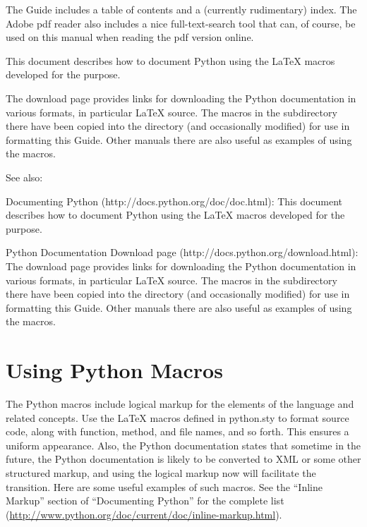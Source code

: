 The Guide includes a table of contents and a (currently rudimentary) index.
The Adobe  pdf reader also includes a nice full-text-search tool that can,
of course, be used on this manual when reading the pdf version online.

\begin{seealso}
 {This
  document describes how to document Python using the \LaTeX{} macros
  developed for the purpose.}

 {The download page provides links for downloading the
  Python documentation in various formats, in particular \LaTeX{} source.
  The macros in the  subdirectory there have been copied
  into the  directory (and occasionally modified) for use
  in formatting this Guide.  Other manuals there are also useful as
  examples of using the macros.}
\end{seealso}
\begin{htmlonly}
See also:

Documenting Python \pythonindex (http://docs.python.org/doc/doc.html): This document
describes how to document Python \pythonindex using the \LaTeX{} \latexindex macros
developed for the purpose.

Python \pythonindex Documentation Download page (http://docs.python.org/download.html):
The download page provides links for downloading the Python \pythonindex documentation
in various formats, in particular \LaTeX{} \latexindex source.  The macros in the
 subdirectory there have been copied into the
 directory (and occasionally modified) for use in
formatting this Guide.  Other manuals there are also useful as examples
of using the macros.
\end{htmlonly}

\section{Using Python Macros}
\pythonindex

The Python \pythonindex macros include logical markup for the elements of the language
and related concepts.  Use the \LaTeX{} \latexindex macros defined in python.sty \pythonindex to
format source code, along with function, method, and file names, and so
forth.  This ensures a uniform appearance.  Also, the Python \pythonindex documentation
states that sometime in the future, the Python \pythonindex documentation is likely to
be converted to XML or some other structured markup, and using the logical
markup now will facilitate the transition.  Here are some useful examples
of such macros.  See the ``Inline Markup'' section of ``Documenting Python'' \pythonindex
for the complete list
(\url{http://www.python.org/doc/current/doc/inline-markup.html}).


